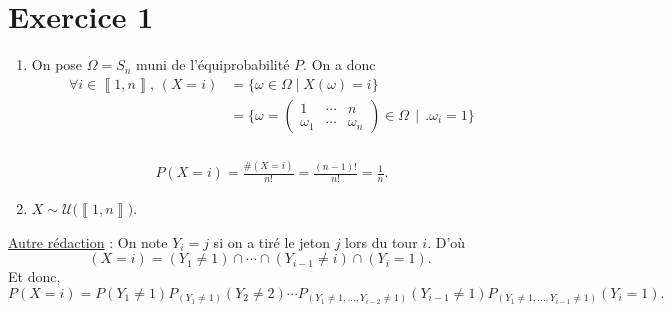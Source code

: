 \part{Exercice 1}

\begin{enumerate}
	\item On pose $\Omega = S_n$ muni de l'équiprobabilité $P$. On a donc
		\begin{align*}
			\forall i \in \left\llbracket 1,n \right\rrbracket,\,(X=i) &= \{\omega \in  \Omega  \mid  X(\omega) = i\}\\
			&= \bigg\{ \omega = \begin{pmatrix}
					1 & \cdots & n\\
					\omega_1 & \cdots & \omega_n
			\end{pmatrix} \in \Omega\:\:\bigg|\:\:\bigg.\omega_i = 1 \bigg\} \\
		\end{align*}

		\begin{align*}
			P(X = i) = \frac{\#(X=i)}{n!} = \frac{(n-1)!}{n!} = \frac{1}{n}.
		\end{align*}
	\item $X \sim \mathcal{U}\!\big(\!\left\llbracket 1,n \right\rrbracket\!\big)$.
\end{enumerate}

\underline{Autre rédaction} :  On note $Y_i = j$ si on a tiré le jeton $j$ lors du tour $i$. D'où \[
	(X=i) = (Y_1 \neq 1) \cap \cdots \cap (Y_{i-1} \neq i) \cap (Y_i = 1)
.\] Et donc,
\[
	P(X = i) = P(Y_1 \neq 1) P_{(Y_1 \neq 1)}(Y_2 \neq 2) \cdots P_{(Y_1\neq 1,\ldots,Y_{i-2}  \neq 1)}(Y_{i-1} \neq 1) P_{(Y_1 \neq 1,\ldots,Y_{i-1} \neq 1)}(Y_i = 1)
.\]

